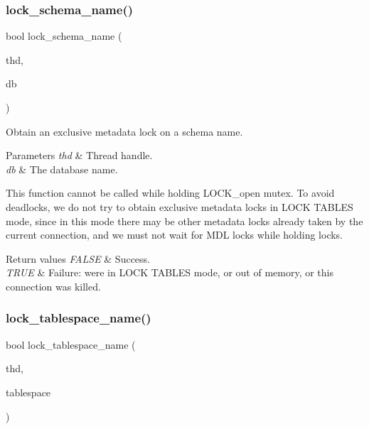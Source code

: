 \subsubsection{\texorpdfstring{lock\+\_\+schema\+\_\+name()}{lock\_schema\_name()}}
{\footnotesize\ttfamily bool lock\+\_\+schema\+\_\+name (\begin{DoxyParamCaption}\item[{T\+HD $\ast$}]{thd,  }\item[{const char $\ast$}]{db }\end{DoxyParamCaption})}

Obtain an exclusive metadata lock on a schema name.


\begin{DoxyParams}{Parameters}
{\em thd} & Thread handle. \\
\hline
{\em db} & The database name.\\
\hline
\end{DoxyParams}
This function cannot be called while holding L\+O\+C\+K\+\_\+open mutex. To avoid deadlocks, we do not try to obtain exclusive metadata locks in L\+O\+CK T\+A\+B\+L\+ES mode, since in this mode there may be other metadata locks already taken by the current connection, and we must not wait for M\+DL locks while holding locks.


\begin{DoxyRetVals}{Return values}
{\em F\+A\+L\+SE} & Success. \\
\hline
{\em T\+R\+UE} & Failure\+: we\textquotesingle{}re in L\+O\+CK T\+A\+B\+L\+ES mode, or out of memory, or this connection was killed. \\
\hline
\end{DoxyRetVals}
\mbox{\label{group__Locking_ga1923c93a226a0a762e9a7675135f770e}} 
\subsubsection{\texorpdfstring{lock\+\_\+tablespace\+\_\+name()}{lock\_tablespace\_name()}}
{\footnotesize\ttfamily bool lock\+\_\+tablespace\+\_\+name (\begin{DoxyParamCaption}\item[{T\+HD $\ast$}]{thd,  }\item[{const char $\ast$}]{tablespace }\end{DoxyParamCaption})}

